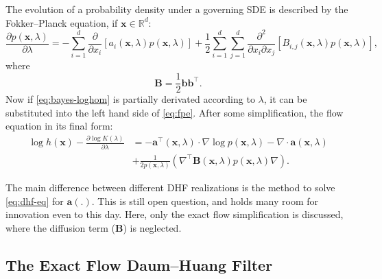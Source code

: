 The evolution of a probability density under a governing SDE is described by the Fokker--Planck equation, if $\mathbf{x} \in \mathbb{R}^d$:
\begin{equation}\label{eq:fpe}
    \frac{\partial p(\mathbf{x},\lambda)}{\partial \lambda} = -\sum_{i = 1}^{d}\frac{\partial}{\partial x_i}\left[a_i(\mathbf{x},\lambda)p(\mathbf{x},\lambda)\right] + \frac{1}{2}\sum_{i = 1}^{d}\sum_{j = 1}^{d}\frac{\partial^2}{\partial x_i \partial x_j}\left[B_{i,j}(\mathbf{x},\lambda)p(\mathbf{x},\lambda)\right],
\end{equation}
where
\begin{equation}\label{key}
    \mathbf{B} = \frac{1}{2}\mathbf{b}\mathbf{b}^\top.
\end{equation}
Now if \eqref{eq:bayes-loghom} is partially derivated according to $\lambda$, it can be substituted into the left hand side of \eqref{eq:fpe}. After some simplification, the flow equation in its final form:
\begin{align}\label{eq:dhf-eq}
    \log h(\mathbf{x}) - \frac{\partial \log K(\lambda)}{\partial \lambda} & = -\mathbf{a}^\top(\mathbf{x},\lambda)\cdot\nabla\log p(\mathbf{x},\lambda) - \nabla\cdot \mathbf{a}(\mathbf{x},\lambda)       \\
                                                                           & + \frac{1}{2p(\mathbf{x},\lambda)}\left(\nabla^\top\mathbf{B}(\mathbf{x},\lambda)p(\mathbf{x},\lambda)\nabla\right). \nonumber
\end{align}

The main difference between different DHF realizations is the method to solve \eqref{eq:dhf-eq} for $\mathbf{a}(.)$. This is still open question, and holds many room for innovation even to this day.  Here, only the exact flow simplification \cite{edh-orig} is discussed, where the diffusion term ($\mathbf{B}$) is neglected.

\subsection{The Exact Flow Daum--Huang Filter}

